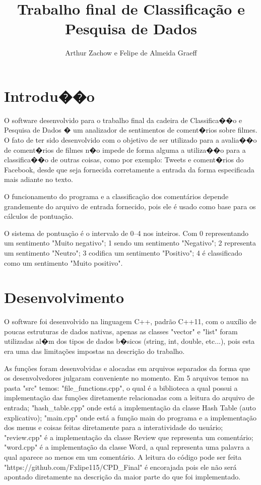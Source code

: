 \documentclass[12pt]{article}
\title{Trabalho final de Classificação e Pesquisa de Dados}
\author{Arthur Zachow\inst{1} e Felipe de Almeida Graeff\inst{1}}
\begin{document}
\maketitle

\section{Introdu��o}
O software desenvolvido para o trabalho final da cadeira de Classifica��o e Pesquisa de Dados � um
analizador de sentimentos de coment�rios sobre filmes. O fato de ter sido desenvolvido com o
objetivo de ser utilizado para a avalia��o de coment�rios de filmes n�o impede de forma alguma a
utiliza��o para a classifica��o de outras coisas, como por exemplo: Tweets e coment�rios do
Facebook, desde que seja fornecida corretamente a entrada da forma especificada mais adiante no
texto.

O funcionamento do programa e a classificação dos comentários depende grandemente do arquivo de
entrada fornecido, pois ele é usado como base para os cálculos de pontuação.

O sistema de pontuação é o intervalo de 0--4 nos inteiros. Com 0 representando um sentimento "Muito
negativo"; 1 sendo um sentimento "Negativo"; 2 representa um sentimento "Neutro"; 3 codifica um
sentimento "Positivo"; 4 é classificado como um sentimento "Muito positivo".

\section{Desenvolvimento}
O software foi desenvolvido na linguagem C++, padrão C++11, com o auxílio de poucas estruturas de
dados nativas, apenas as classes "vector" e "list" foram utilizadas al�m dos tipos de dados b�sicos
(string, int, double, etc...), pois esta era uma das limitações impostas na descrição do
trabalho.

As funções foram desenvolvidas e alocadas em arquivos separados da forma que os desenvolvedores
julgaram conveniente no momento. Em 5 arquivos temos na pasta "src" temos: "file\_functions.cpp", o
qual é a biblioteca a qual possui a implementação das funções diretamente relacionadas com a leitura
do arquivo de entrada; "hash\_table.cpp" onde está a implementação da classe Hash Table (auto
explicativo); "main.cpp" onde está a função main do programa e a implementação dos menus e coisas
feitas diretamente para a interatividade do usuário; "review.cpp" é a implementação da classe Review
que representa um comentário; "word.cpp" é a implementação da classe Word, a qual representa uma
palavra a qual aparece ao menos em um comentário. A leitura do código pode ser feita
"https://github.com/Fxlipe115/CPD\_Final" é encorajada pois ele não será apontado diretamente na
descrição da maior parte do que foi implementado.
\end{document}
